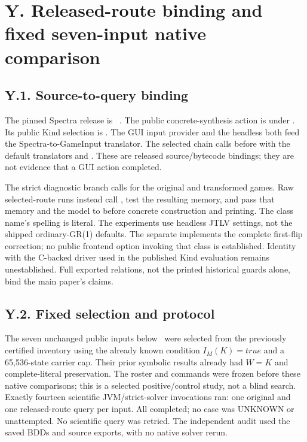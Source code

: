 \section*{Y. Released-route binding and fixed seven-input native comparison}
\subsection*{Y.1. Source-to-query binding}
The pinned Spectra release is ~\cite{spectrarelease2024}.
The public concrete-synthesis action is  under
. Its public Kind selection is
. The GUI input provider and the headless
 both feed the Spectra-to-GameInput
translator. The selected chain calls
 before
 with the default translators and
. These are released source/bytecode
bindings; they are not evidence that a GUI action completed.

The strict diagnostic branch calls  for the original and
transformed games. Raw selected-route runs instead call
, test the resulting memory, and pass that memory
and the model to  before
concrete construction and printing. The class name's spelling is literal.
The experiments use headless JTLV settings, not the shipped ordinary-GR(1)
defaults. The separate  implements the
complete first-flip correction; no public frontend option invoking that
class is established. Identity with the C-backed driver used in the
published Kind evaluation remains unestablished. Full exported relations,
not the printed historical guards alone, bind the main paper's claims.

\subsection*{Y.2. Fixed selection and protocol}
The seven unchanged public inputs below~\cite{fixedsevennative2026} were selected from the previously
certified inventory using the already known condition $I_M(K)=\mathit{true}$
and a 65,536-state carrier cap.
Their prior symbolic results already had $W=K$ and complete-literal
preservation. The roster and commands were frozen before these native
comparisons; this is a selected positive/control study, not a blind search.
Exactly fourteen scientific JVM/strict-solver invocations ran: one original
and one released-route query per input. All completed; no case was UNKNOWN
or unattempted. No scientific query was retried. The independent audit
used the saved BDDs and source exports, with no native solver rerun.

